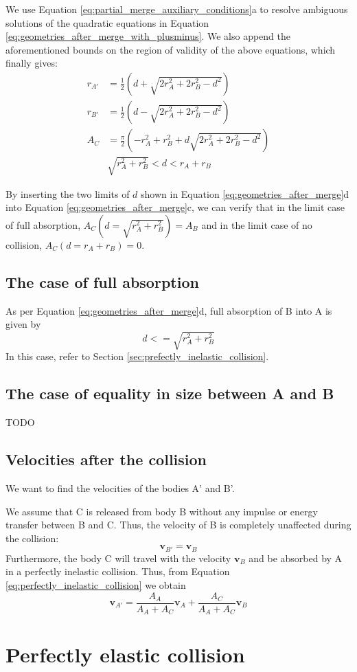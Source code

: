 \documentclass{article}
\newcommand{\vbs}[0]{\boldsymbol{v}}
\begin{document}
We use Equation \ref{eq:partial_merge_auxiliary_conditions}a to resolve ambiguous solutions of the quadratic equations in Equation \ref{eq:geometries_after_merge_with_plusminus}. We also append the aforementioned bounds on the region of validity of the above equations, which finally gives:
\begin{equation}
\label{eq:geometries_after_merge}
\begin{split}
r_{A'} &= \frac{1}{2}\left(d + \sqrt{2r_A^2 + 2r_B^2 - d^2}\right)\\
r_{B'} &= \frac{1}{2}\left(d - \sqrt{2r_A^2 + 2r_B^2 - d^2}\right)\\
A_C &= \frac{\pi}{2}\left(-r_A^2 + r_B^2 + d\sqrt{2r_A^2 + 2r_B^2 - d^2}\right)\\
&\sqrt{r_A^2 + r_B^2} < d < r_A + r_B
\end{split}
\end{equation}

By inserting the two limits of $d$ shown in Equation \ref{eq:geometries_after_merge}d into Equation \ref{eq:geometries_after_merge}c, we can verify that in the limit case of full absorption, $A_C(d = \sqrt{r_A^2 + r_B^2}) = A_B$ and in the limit case of no collision, $A_C(d = r_A + r_B) = 0$.

\subsection{The case of full absorption}
As per Equation \ref{eq:geometries_after_merge}d, full absorption of B into A is given by
\begin{equation}
d <= \sqrt{r_A^2 + r_B^2}
\end{equation}
In this case, refer to Section \ref{sec:prefectly_inelastic_collision}.

\subsection{The case of equality in size between A and B}
TODO



\subsection{Velocities after the collision}
We want to find the velocities of the bodies A' and B'.

We assume that C is released from body B without any impulse or energy transfer between B and C. Thus, the velocity of B is completely unaffected during the collision:
\begin{equation}
\vbs_{B'} = \vbs_B
\end{equation}
Furthermore, the body C will travel with the velocity $\vbs_B$ and be absorbed by A in a perfectly inelastic collision. Thus, from Equation \ref{eq:perfectly_inelastic_collision} we obtain
\begin{equation}
\vbs_{A'} = \frac{A_A}{A_A + A_C}\vbs_A + \frac{A_C}{A_A + A_C}\vbs_B
\end{equation}


\section{Perfectly elastic collision}
\end{document}
